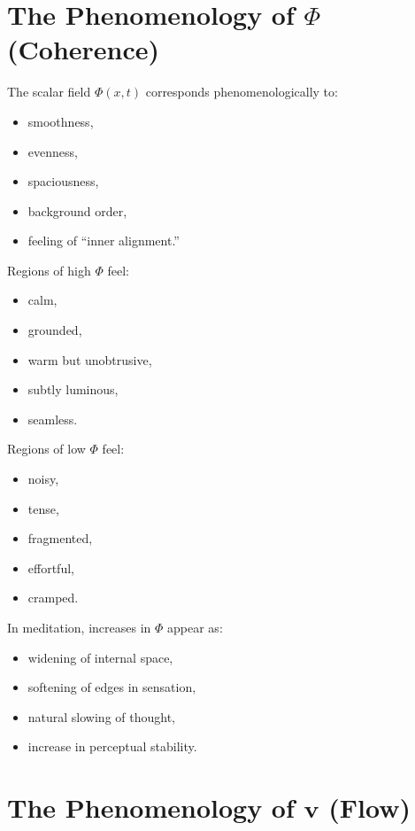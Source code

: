 \documentclass[12pt]{article}
\begin{document}
\section{The Phenomenology of $\Phi$ (Coherence)}

The scalar field $\Phi(x,t)$ corresponds phenomenologically to:

\begin{itemize}
    \item smoothness,
    \item evenness,
    \item spaciousness,
    \item background order,
    \item feeling of ``inner alignment.''
\end{itemize}

Regions of high $\Phi$ feel:

\begin{itemize}
    \item calm,
    \item grounded,
    \item warm but unobtrusive,
    \item subtly luminous,
    \item seamless.
\end{itemize}

Regions of low $\Phi$ feel:

\begin{itemize}
    \item noisy,
    \item tense,
    \item fragmented,
    \item effortful,
    \item cramped.
\end{itemize}

In meditation, increases in $\Phi$ appear as:

\begin{itemize}
    \item widening of internal space,
    \item softening of edges in sensation,
    \item natural slowing of thought,
    \item increase in perceptual stability.
\end{itemize}

\section{The Phenomenology of $\mathbf{v}$ (Flow)}
\end{document}
